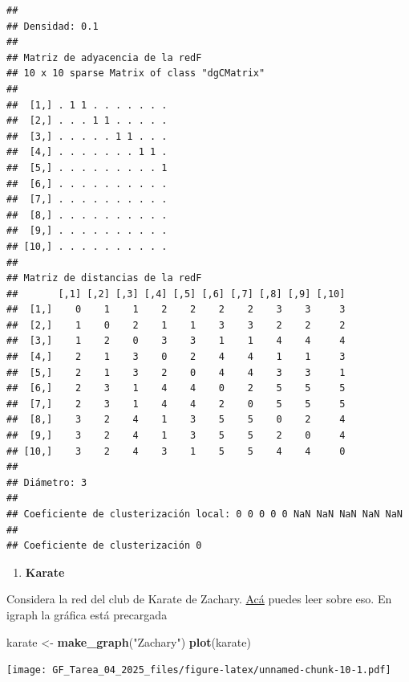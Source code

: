 \documentclass[
]{article}
\newenvironment{Shaded}{\begin{snugshade}}{\end{snugshade}}
\newcommand{\FunctionTok}[1]{\textcolor[rgb]{0.13,0.29,0.53}{\textbf{#1}}}
\newcommand{\NormalTok}[1]{#1}
\newcommand{\OtherTok}[1]{\textcolor[rgb]{0.56,0.35,0.01}{#1}}
\newcommand{\StringTok}[1]{\textcolor[rgb]{0.31,0.60,0.02}{#1}}
\providecommand{\tightlist}{%
  \setlength{\itemsep}{0pt}\setlength{\parskip}{0pt}}
\begin{document}
\begin{verbatim}
## 
## Densidad: 0.1 
## 
## Matriz de adyacencia de la redF 
## 10 x 10 sparse Matrix of class "dgCMatrix"
##                          
##  [1,] . 1 1 . . . . . . .
##  [2,] . . . 1 1 . . . . .
##  [3,] . . . . . 1 1 . . .
##  [4,] . . . . . . . 1 1 .
##  [5,] . . . . . . . . . 1
##  [6,] . . . . . . . . . .
##  [7,] . . . . . . . . . .
##  [8,] . . . . . . . . . .
##  [9,] . . . . . . . . . .
## [10,] . . . . . . . . . .
## 
## Matriz de distancias de la redF 
##       [,1] [,2] [,3] [,4] [,5] [,6] [,7] [,8] [,9] [,10]
##  [1,]    0    1    1    2    2    2    2    3    3     3
##  [2,]    1    0    2    1    1    3    3    2    2     2
##  [3,]    1    2    0    3    3    1    1    4    4     4
##  [4,]    2    1    3    0    2    4    4    1    1     3
##  [5,]    2    1    3    2    0    4    4    3    3     1
##  [6,]    2    3    1    4    4    0    2    5    5     5
##  [7,]    2    3    1    4    4    2    0    5    5     5
##  [8,]    3    2    4    1    3    5    5    0    2     4
##  [9,]    3    2    4    1    3    5    5    2    0     4
## [10,]    3    2    4    3    1    5    5    4    4     0
## 
## Diámetro: 3 
## 
## Coeficiente de clusterización local: 0 0 0 0 0 NaN NaN NaN NaN NaN 
## 
## Coeficiente de clusterización 0
\end{verbatim}

\begin{enumerate}
\def\labelenumi{\arabic{enumi}.}
\tightlist
\item
  \textbf{Karate}
\end{enumerate}

Considera la red del club de Karate de Zachary.
\href{https://en.wikipedia.org/wiki/Zachary\%27s_karate_club}{Acá}
puedes leer sobre eso. En igraph la gráfica está precargada

\begin{Shaded}
\begin{Highlighting}[]
\NormalTok{karate }\OtherTok{\textless{}{-}} \FunctionTok{make\_graph}\NormalTok{(}\StringTok{"Zachary"}\NormalTok{)}
\FunctionTok{plot}\NormalTok{(karate)}
\end{Highlighting}
\end{Shaded}

\texttt{[image: GF\_Tarea\_04\_2025\_files/figure-latex/unnamed-chunk-10-1.pdf]}
\end{document}
